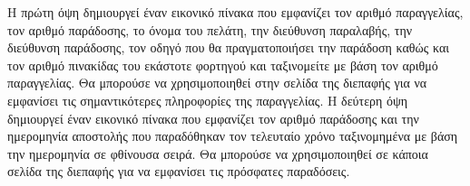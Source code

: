 Η πρώτη όψη δημιουργεί έναν εικονικό πίνακα που εμφανίζει τον αριθμό παραγγελίας, τον αριθμό παράδοσης, το όνομα του πελάτη, την διεύθυνση παραλαβής, την διεύθυνση παράδοσης, τον οδηγό που θα πραγματοποιήσει την παράδοση καθώς και τον αριθμό πινακίδας του εκάστοτε φορτηγού και ταξινομείτε με βάση τον αριθμό παραγγελίας. Θα μπορούσε να χρησιμοποιηθεί στην σελίδα της διεπαφής για να εμφανίσει τις σημαντικότερες πληροφορίες της παραγγελίας.
\hfill \break
Η δεύτερη όψη δημιουργεί έναν εικονικό πίνακα που εμφανίζει τον αριθμό παράδοσης και την ημερομηνία αποστολής που παραδόθηκαν τον τελευταίο χρόνο ταξινομημένα με βάση την ημερομηνία σε φθίνουσα σειρά. Θα μπορούσε να χρησιμοποιηθεί σε κάποια σελίδα της διεπαφής για να εμφανίσει τις πρόσφατες παραδόσεις.
\hfill \break

